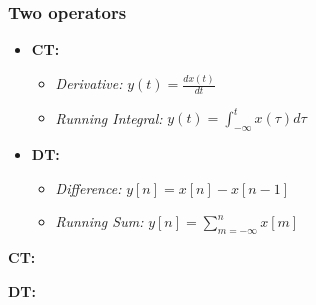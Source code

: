     \subsubsection{Two operators}
    \begin{definition}
        \begin{itemize}
            \item \textbf{CT:}
            \begin{itemize}
                \item \textit{Derivative:} $y(t) = \frac{dx(t)}{dt}$
                \item \textit{Running Integral:} $y(t) = \int_{-\infty}^{t} x(\tau) d\tau$
            \end{itemize}
            
            \item \textbf{DT:}
            \begin{itemize}
                \item \textit{Difference:} $y[n] = x[n] - x[n-1]$
                \item \textit{Running Sum:} $y[n] = \sum_{m=-\infty}^{n} x[m]$
            \end{itemize}
        \end{itemize}
    \end{definition}

    \begin{intuition}
        \textbf{CT:}

        \textbf{DT:}
    \end{intuition}

